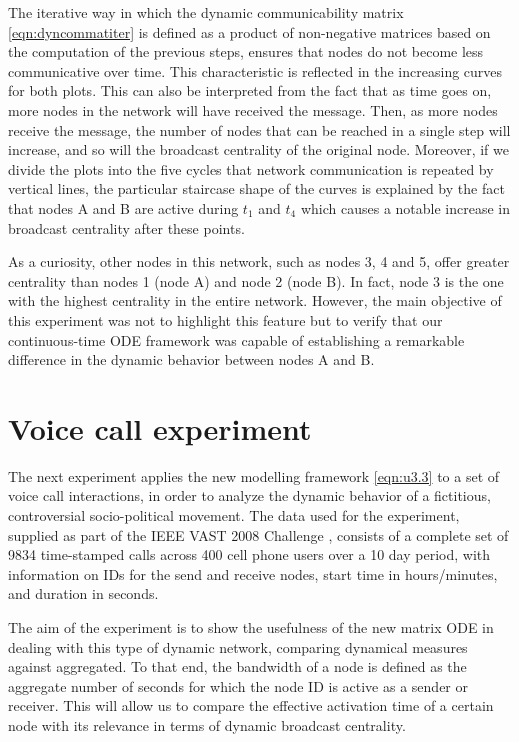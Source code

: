 The iterative way in which the dynamic communicability matrix \eqref{eqn:dyncommatiter} is defined as a product of non-negative matrices based on the computation of the previous steps, ensures that nodes do not become less communicative over time. This characteristic is reflected in the increasing curves for both plots. This can also be interpreted from the fact that as time goes on, more nodes in the network will have received the message. Then, as more nodes receive the message, the number of nodes that can be reached in a single step will increase, and so will the broadcast centrality of the original node. Moreover, if we divide the plots into the five cycles that network communication is repeated by vertical lines, the particular staircase shape of the curves is explained by the fact that nodes A and B are active during $t_1$ and $t_4$ which causes a notable increase in broadcast centrality after these points.

As a curiosity, other nodes in this network, such as nodes 3, 4 and 5, offer greater centrality than nodes 1 (node A) and node 2 (node B). In fact, node 3 is the one with the highest centrality in the entire network. However, the main objective of this experiment was not to highlight this feature but to verify that our continuous-time ODE framework was capable of establishing a remarkable difference in the dynamic behavior between nodes A and B.

\newpage

\section{Voice call experiment}
\label{sec:voicecall}
The next experiment applies the new modelling framework \eqref{eqn:u3.3} to a set of voice call interactions, in order to analyze the dynamic behavior of a fictitious, controversial socio-political movement. The data used for the experiment, supplied as part of the IEEE VAST 2008 Challenge \cite{grinstein2008vast}, consists of a complete set of 9834 time-stamped calls across 400 cell phone users over a 10 day period, with information on IDs for the send and receive nodes, start time in hours/minutes, and duration in seconds.

The aim of the experiment is to show the usefulness of the new matrix ODE in dealing with this type of dynamic network, comparing dynamical measures against aggregated. To that end, the bandwidth of a node is defined as the aggregate number of seconds for which the node ID is active as a sender or receiver. This will allow us to compare the effective activation time of a certain node with its relevance in terms of dynamic broadcast centrality.

